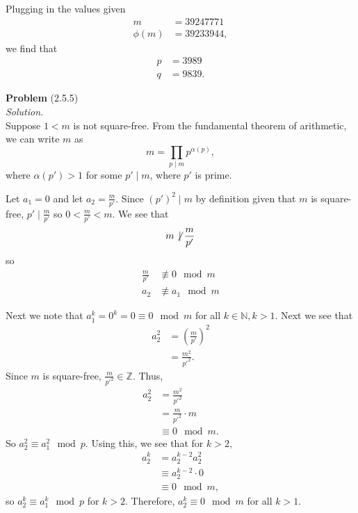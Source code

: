 \documentclass[12 pt]{amsart}
\begin{document}
  Plugging in the values given
  \begin{align*}
    m &= 39247771 \\
    \phi(m) &= 39233944,
  \end{align*}
  we find that
  \begin{align*}
    p &= 3989 \\
    q &= 9839.
  \end{align*}
\vfill
\newpage



\phantom{\quad} \vfill
\noindent
\textbf{Problem} (2.5.5) \\[4ex]
\emph{Solution.} \\[2ex]
  Suppose $1 < m$ is not square-free. 
  From the fundamental theorem of arithmetic, we can write $m$ as
  \[
    m = \prod_{p \mid m} p^{\alpha(p)},
  \]
  where $\alpha(p') > 1$ for some $p' \mid m$, where $p'$ is prime.

  Let $a_1 = 0$ and 
  let $a_2 = \frac{m}{p'}$.
  Since $(p')^2 \mid m$ by definition given that $m$ is square-free,
  $p' \mid \frac{m}{p'}$ so $0 < \frac{m}{p'} < m$.
  We see that 
  \begin{align*}
    m &\not \, \mid \frac{m}{p'} \\
  \end{align*}
  so 
  \begin{align*}
    \frac{m}{p'} &\not \equiv 0 \mod m \\
    a_2 &\not \equiv a_1 \mod m
  \end{align*}

  Next we note that $a_1^k = 0^k = 0 \equiv 0 \mod m$ 
  for all $k \in \mathbb{N}, k > 1$.
  Next we see that
  \begin{align*}
    a_2^2 &= \left( \frac{m}{p'} \right)^2 \\
          &= \frac{m^2}{p'^2}.
  \end{align*}
  Since $m$ is square-free, $\frac{m}{p'^2} \in \mathbb{Z}$. 
  Thus, 
  \begin{align*}
    a_2^2 &= \frac{m^2}{p'^2} \\
          &= \frac{m}{p'^2} \cdot m \\
          &\equiv 0 \mod m.
  \end{align*}
  So $a_2^2 \equiv a_1^2 \mod p$.
  Using this, we see that for $k > 2$, 
  \begin{align*}
    a_2^k &= a_2^{k-2} a_2^2 \\
          &\equiv a_2^{k-2} \cdot 0 \\
          &\equiv 0 \mod m,
  \end{align*}
  so $a_2^k \equiv a_1^k \mod p$ for $k > 2$.
  Therefore, $a_2^k \equiv 0 \mod m$ for all $k > 1$. 
\end{document}
